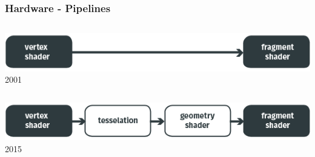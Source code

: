 

	\begin{frame}\frametitle{Hardware - Pipelines}
		\begin{columns}
			\begin{column}{0.9\textwidth}
				\begin{center}
					\includegraphics[width=\textwidth]{img/3_pipeline/pipelineDifferences_oldOpenGL.png}
					\small{2001}
				\end{center}	
			\end{column}
		\end{columns}
		\pause
		\vspace{0.8cm}
		\begin{columns}
			\begin{column}{0.9\textwidth}
				\begin{center}
					\includegraphics[width=\textwidth]{img/3_pipeline/pipelineDifferences_newOpenGL.png}
					\small{2015}
				\end{center}	
			\end{column}
		\end{columns}
	\end{frame}

